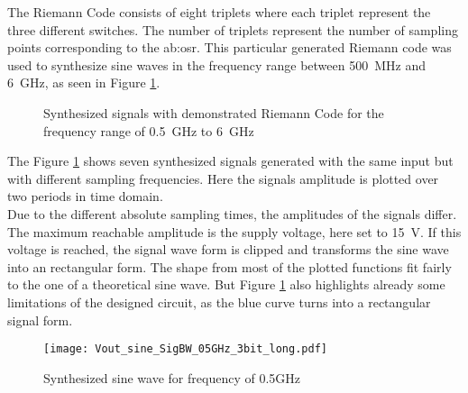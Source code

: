  The Riemann Code consists of eight triplets where each triplet represent the three different switches.
The number of triplets represent the number of sampling points corresponding to the \gls{ab:osr}.
This particular generated Riemann code was used to synthesize sine waves in the frequency range between \SI{500}{\MHz} and \SI{6}{\GHz}, as seen in Figure \ref{fig:7SignalsSameSlopeInOnePlot}.


\begin{figure}[htb!]
   \centering 
   
   \caption{Synthesized signals with demonstrated Riemann Code for the frequency range of \SI{0.5}{\GHz} to \SI{6}{\GHz}}
   \label{fig:7SignalsSameSlopeInOnePlot}
\end{figure}

The Figure \ref{fig:7SignalsSameSlopeInOnePlot} shows seven synthesized signals generated with the same input but with different sampling frequencies. 
Here the signals amplitude is plotted over two periods in time domain.\\
Due to the different absolute sampling times, the amplitudes of the signals differ.
The maximum reachable amplitude is the supply voltage, here set to \SI{15}{\volt}. %
If this voltage is reached, the signal wave form is clipped and transforms the sine wave into an rectangular form.
The shape from most of the plotted functions fit fairly to the one of a theoretical sine wave.
But Figure \ref{fig:7SignalsSameSlopeInOnePlot} also highlights already some limitations of the designed circuit, as the blue curve turns into a rectangular signal form.\\

\begin{figure}[htb!]
   \centering
   \texttt{[image: Vout\_sine\_SigBW\_05GHz\_3bit\_long.pdf]}
   \caption{Synthesized sine wave for frequency of 0.5GHz}
   \label{fig:SineWave05GHz}
\end{figure}

